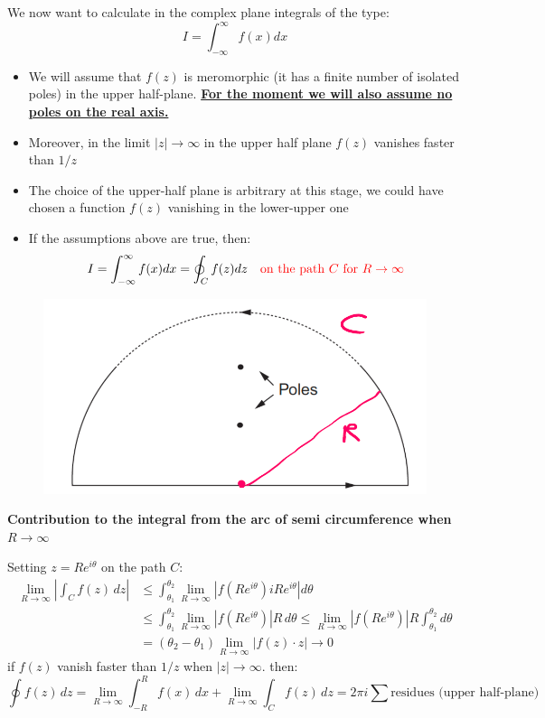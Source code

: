 \documentclass{article}
\begin{document}
\noindent
We now want to calculate in the complex plane integrals of the type:
\begin{equation}
    I = \int_{-\infty}^{\infty} f(x)dx
\end{equation}
\begin{itemize}
    \item We will assume that $f(z)$ is meromorphic (it has a finite number of isolated poles) in the upper half-plane. \underline{\textbf{For the moment we will also assume no poles on the real axis.}}
    \item Moreover, in the limit $|z| \rightarrow \infty$ in the upper half plane $f(z)$ vanishes faster than $1/z$
    \item The choice of the upper-half plane is arbitrary at this stage, we could have chosen a function $f(z)$ vanishing in the lower-upper one
    \item If the assumptions above are true, then:
    \begin{equation}
        I = \int_{-\infty}^{\infty} f(x)dx = \oint_C f(z)dz \quad \textcolor{red}{\text{on the path $C$ for $R \rightarrow \infty$}}
    \end{equation}
\end{itemize}
\begin{figure}[h]
    \centering
    \includegraphics[width=0.5\linewidth]{fig37.png}
\end{figure}

\newpage

\noindent
\textbf{Contribution to the integral from the arc of semi circumference when $R \rightarrow \infty$}

\noindent
Setting $z = Re^{i \theta}$ on the path $C$:
\begin{align*}
    \lim_{R \to \infty} \left| \int_{C} f(z) \, dz \right|
&\leq \int_{\theta_1}^{\theta_2} \lim_{R \to \infty} \left| f\left( R e^{i\theta} \right) i R e^{i\theta} \right| d\theta\\
&\leq \int_{\theta_1}^{\theta_2} \lim_{R \to \infty} \left| f\left( R e^{i\theta} \right) \right| R \, d\theta
\leq \lim_{R \to \infty} \left| f\left( R e^{i\theta} \right) \right| R \int_{\theta_1}^{\theta_2} d\theta\\
&= (\theta_2 - \theta_1) \lim_{R \to \infty} \left| f(z) \cdot z \right| \to 0
\end{align*}
if $f(z)$ vanish faster than $1/z$ when $|z| \rightarrow \infty$. then:
\begin{equation}
    \oint f(z) \, dz = \lim_{R \to \infty} \int_{-R}^{R} f(x) \, dx + \lim_{R \to \infty} \int_{C} f(z) \, dz = 2\pi i \sum \text{residues (upper half-plane)}
\end{equation}
\end{document}
